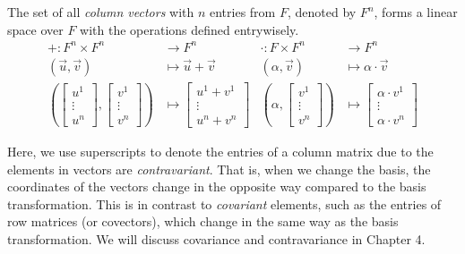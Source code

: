 \begin{example}
  The set of all \emph{column vectors} with $n$ entries from $F$, denoted by $F^n$, forms a linear space over $F$ with the operations defined entrywisely.
  \begin{align*}
    + \colon F^n \times F^n                                                                                                  & \to F^n                                                                & \cdot \colon F \times F^n                                         & \to F^n                                                                              \\
    (\vec{u}, \vec{v})                                                                                                  & \mapsto \vec{u} + \vec{v}                                              & (\alpha, \vec{v})                                            & \mapsto \alpha \cdot \vec{v}                                                         \\
    \left(\begin{bmatrix} u^1 \\ \vdots \\ u^n \end{bmatrix}, \begin{bmatrix} v^1 \\ \vdots \\ v^n \end{bmatrix}\right) & \mapsto \begin{bmatrix} u^1 + v^1 \\ \vdots \\ u^n + v^n \end{bmatrix} & \left(\alpha, \begin{bmatrix} v^1 \\ \vdots \\ v^n \end{bmatrix}\right) & \mapsto \begin{bmatrix} \alpha \cdot v^1 \\ \vdots \\ \alpha \cdot v^n \end{bmatrix}
  \end{align*}
\end{example}

\begin{remark}
  Here, we use superscripts to denote the entries of a column matrix due to the elements in vectors are \emph{contravariant}. That is, when we change the basis, the coordinates of the vectors change in the opposite way compared to the basis transformation. This is in contrast to \emph{covariant} elements, such as the entries of row matrices (or covectors), which change in the same way as the basis transformation. We will discuss covariance and contravariance in Chapter 4.
\end{remark}


